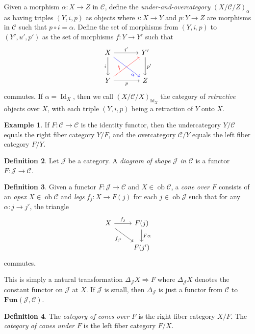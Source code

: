\documentclass[10pt,letterpaper,cm]{nupset}
\theoremstyle{definition}
\newtheorem{definition}{Definition}[section]
\newtheorem{exmp}[definition]{Example}
\theoremstyle{theorem}
\theoremstyle{remark}
\newcommand{\1}{\mathbf{1}}
\renewcommand{\c}{\mathscr{C}}
\renewcommand{\j}{\mathscr{J}}
\newcommand{\0}{\vec 0}
\DeclareMathOperator{\id}{Id}
\DeclareMathOperator{\ob}{ob}
\begin{document}
Given a morphism $\alpha : X \to Z$ in $\c$, define the \textit{under-and-overcategory} $\left(X/\c/Z\right)_{\alpha}$ as having triples $\left(Y, i, p\right)$ as objects where $i : X \to Y$ and $p: Y \to Z$ are morphisms in $\c$ such that $p\circ i = \alpha$. Define the set of morphisms from $\left(Y, i, p\right)$ to $\left(Y', u', p'\right)$ as the set of morphisms $f: Y \to Y'$ such that 
\[
\begin{tikzcd}[row sep=large, column sep=large]
X \arrow[to=Z, "i ", swap] \arrow[to=2-2, dr, blue, sloped,pos=.8, "\alpha", swap]
& Y' \arrow[to=2-2, "p' "] \\
|[alias=Z]| Y \arrow[to=1-2, ur, red, sloped,pos=.3, "f"] \arrow[to=2-2, "p"'] 
& Z
\arrow[from=ul, to=1-2, "i' "]
\end{tikzcd}
\]
commutes. If $\alpha = \id_X$, then we call $\left(X/\c/X\right)_{\id_X}$ the category of \textit{retractive} objects over $X$, with each triple $\left(Y, i, p\right)$ being a retraction of $Y$ onto $X$.


\begin{exmp}
If $F: \c \to \c$ is the identity functor, then the undercategory $Y/\c$ equals the right fiber category $Y/F$, and the overcategory $\c/Y$ equals the left fiber category $F/Y$.
\end{exmp}

\medskip

\begin{definition}
Let $\j$ be a category. A \textit{diagram of shape $\j$ in $\c$} is a functor $F: \j \to \c$.
\end{definition}

\begin{definition}
Given a functor $F: \j \to \c$ and $X \in \ob \c$, a \textit{cone over $F$} consists of an \textit{apex} $X\in \ob \c$ and \textit{legs} $f_j : X \to F(j)$ for each $j \in \ob \j$ such that for any $\alpha : j \to j'$, the triangle
\[ \begin{tikzcd}
X \arrow[r, "f_j"] \arrow[swap, dr,  " f_{j'} "] & F(j) \arrow[d, "F\alpha"] \\
 & F(j')
\end{tikzcd}
\]
commutes.
\end{definition}

 This is simply a natural transformation $\Delta_{\j} X \Rightarrow F$ where $\Delta_{\j} X$ denotes the constant functor on $\j$ at $X$. If $\j$ is small, then $\Delta_{\j}$ is just a functor from $\c$ to $\mathbf{Fun}(\j, \c)$.

\begin{definition}
The \textit{category of cones over $F$} is the right fiber category $X/F$. The \textit{category of cones under $F$} is the left fiber category  $F/X$.
\end{definition}
\end{document}
